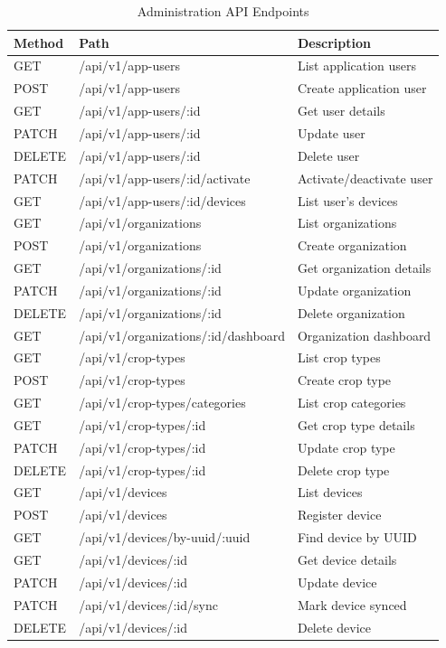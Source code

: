 \begin{longtable}{lll}
\caption{Administration API Endpoints}
\label{tab:admin-api} \\
\toprule
\textbf{Method} & \textbf{Path} & \textbf{Description} \\
\midrule
\endhead
\midrule
\endfoot
\bottomrule
\endlastfoot
GET & /api/v1/app-users & List application users \\
POST & /api/v1/app-users & Create application user \\
GET & /api/v1/app-users/:id & Get user details \\
PATCH & /api/v1/app-users/:id & Update user \\
DELETE & /api/v1/app-users/:id & Delete user \\
PATCH & /api/v1/app-users/:id/activate & Activate/deactivate user \\
GET & /api/v1/app-users/:id/devices & List user's devices \\
GET & /api/v1/organizations & List organizations \\
POST & /api/v1/organizations & Create organization \\
GET & /api/v1/organizations/:id & Get organization details \\
PATCH & /api/v1/organizations/:id & Update organization \\
DELETE & /api/v1/organizations/:id & Delete organization \\
GET & /api/v1/organizations/:id/dashboard & Organization dashboard \\
GET & /api/v1/crop-types & List crop types \\
POST & /api/v1/crop-types & Create crop type \\
GET & /api/v1/crop-types/categories & List crop categories \\
GET & /api/v1/crop-types/:id & Get crop type details \\
PATCH & /api/v1/crop-types/:id & Update crop type \\
DELETE & /api/v1/crop-types/:id & Delete crop type \\
GET & /api/v1/devices & List devices \\
POST & /api/v1/devices & Register device \\
GET & /api/v1/devices/by-uuid/:uuid & Find device by UUID \\
GET & /api/v1/devices/:id & Get device details \\
PATCH & /api/v1/devices/:id & Update device \\
PATCH & /api/v1/devices/:id/sync & Mark device synced \\
DELETE & /api/v1/devices/:id & Delete device \\
\end{longtable}

